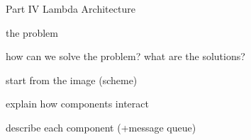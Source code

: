 Part IV Lambda Architecture

the problem

how can we solve the problem? what are the solutions?

start from the image (scheme)

explain how components interact

describe each component (+message queue)

